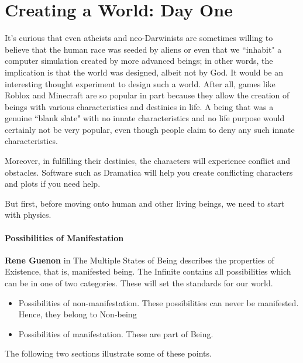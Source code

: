 \section{Creating a World: Day One}

It's curious that even atheists and neo-Darwinists are sometimes willing to believe that the human race was seeded by aliens or even that we ``inhabit" a computer simulation created by more advanced beings; in other words, the implication is that the world was designed, albeit not by God. It would be an interesting thought experiment to design such a world. After all, games like Roblox and Minecraft are so popular in part because they allow the creation of beings with various characteristics and destinies in life. A being that was a genuine ``blank slate" with no innate characteristics and no life purpose would certainly not be very popular, even though people claim to deny any such innate characteristics.

Moreover, in fulfilling their destinies, the characters will experience conflict and obstacles. Software such as Dramatica will help you create conflicting characters and plots if you need help.

But first, before moving onto human and other living beings, we need to start with physics.

\paragraph{Possibilities of Manifestation}
\textbf{Rene Guenon} in The Multiple States of Being describes the properties of Existence, that is, manifested being. The Infinite contains all possibilities which can be in one of two categories. These will set the standards for our world.

\begin{itemize}
\item Possibilities of non-manifestation. These possibilities can never be manifested. Hence, they belong to Non-being 
\item Possibilities of manifestation. These are part of Being. 
\end{itemize}
The following two sections illustrate some of these points.


